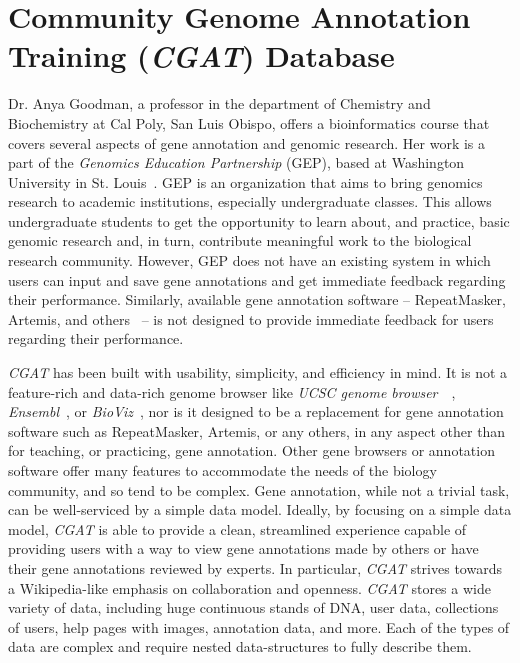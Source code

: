 \documentclass[12pt]{ucthesis}
\begin{document}
\section{Community Genome Annotation Training (\textit{CGAT}) Database}
\label{cgat}

Dr. Anya Goodman, a professor in the department of Chemistry and Biochemistry
at Cal Poly, San Luis Obispo, offers a bioinformatics course that covers
several aspects of gene annotation and genomic research. Her work is a part of
the \textit{Genomics Education Partnership} (GEP), based at Washington
University in St. Louis~\cite{gep}. GEP is an organization that aims to bring
genomics research to academic institutions, especially undergraduate classes.
This allows undergraduate students to get the opportunity to learn about, and
practice, basic genomic research and, in turn, contribute meaningful work to
the biological research community. However, GEP does not have an existing
system in which users can input and save gene annotations and get immediate
feedback regarding their performance. Similarly, available gene annotation
software -- RepeatMasker, Artemis, and others~\cite{repeatmasker, artemis} -- is
not designed to provide immediate feedback for users regarding their
performance. 

\textit{CGAT} has been built with usability,
simplicity, and efficiency in mind. It is not a feature-rich and data-rich
genome browser like \textit{UCSC genome browser}~~\cite{ucscbrowser},
\textit{Ensembl}~\cite{ensembl}, or \textit{BioViz}~\cite{bioviz}, nor is it
designed to be a replacement for gene annotation software such as
RepeatMasker, Artemis, or any others, in any aspect other than for teaching, or
practicing, gene annotation. Other gene browsers or annotation software offer
many features to accommodate the needs of the biology community, and so tend to
be complex. Gene annotation, while not a trivial task, can be well-serviced by
a simple data model. Ideally, by focusing on a simple data model, \textit{CGAT}
is able to provide a clean, streamlined experience capable of providing users
with a way to view gene annotations made by others or have their gene
annotations reviewed by experts. In particular, \textit{CGAT} strives towards a
Wikipedia-like emphasis on collaboration and openness. \textit{CGAT} stores a wide variety
of data, including huge continuous stands of DNA, user data, collections of users,
help pages with images, annotation data, and more. Each of the types of data are
complex and require nested data-structures to fully describe them.
\end{document}
